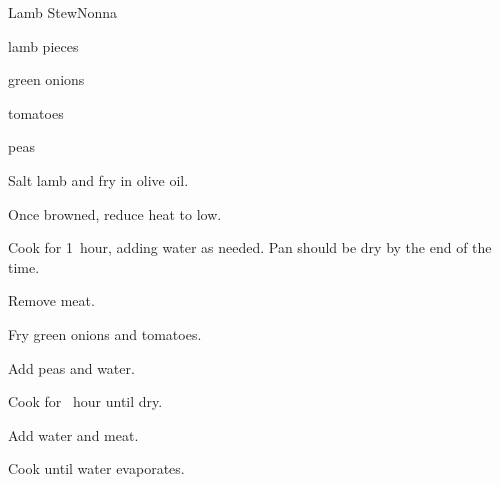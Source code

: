 \begin{recipe}{Lamb Stew}{Nonna}{}

\begin{ingredients}
\item lamb pieces
\item green onions
\item tomatoes
\item peas
\end{ingredients}

\begin{directions}
\item Salt lamb and fry in olive oil.
\item Once browned, reduce heat to low.
\item Cook for 1\half~hour, adding water as needed. Pan should be dry by the end of the time.
\item Remove meat.
\item Fry green onions and tomatoes.
\item Add peas and water.
\item Cook for \half~hour until dry.
\item Add \C{\half} water and meat.
\item Cook until water evaporates.
\end{directions}

\end{recipe}
